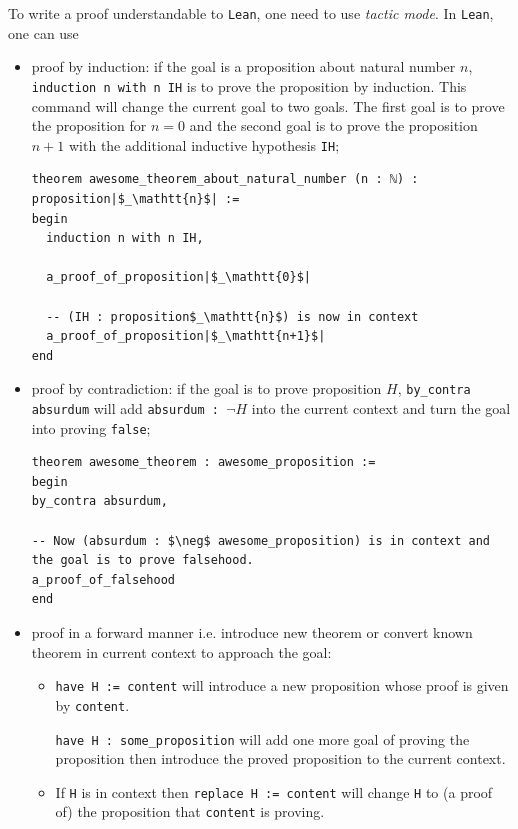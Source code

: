 \documentclass{report}
\theoremstyle{definition}
\begin{document}
To write a proof understandable to {\tt \small Lean}, one need to use {\it tactic mode}. In {\tt \small Lean}, one can use
\begin{itemize}
  \item proof by induction: if the goal is a proposition about natural number $n$, {\tt \small induction n with n IH} is to prove the proposition by induction. This command will change the current goal to two goals. The first goal is to prove the proposition for $n=0$ and the second goal is to prove the proposition $n+1$ with the additional inductive hypothesis {\tt \small IH};

\begin{verbatim}
theorem awesome_theorem_about_natural_number (n : ℕ) : proposition|$_\mathtt{n}$| :=
begin
  induction n with n IH,

  a_proof_of_proposition|$_\mathtt{0}$|

  -- (IH : proposition$_\mathtt{n}$) is now in context
  a_proof_of_proposition|$_\mathtt{n+1}$|
end
\end{verbatim}

  \item proof by contradiction: if the goal is to prove proposition $H$, {\tt \small by\_contra absurdum} will add {\tt \small absurdum : $\neg H$} into the current context and turn the goal into proving {\tt \small false};

\begin{verbatim}
theorem awesome_theorem : awesome_proposition :=
begin
by_contra absurdum,

-- Now (absurdum : $\neg$ awesome_proposition) is in context and the goal is to prove falsehood.
a_proof_of_falsehood
end
\end{verbatim}
  \item proof in a forward manner i.e. introduce new theorem or convert known theorem in current context to approach the goal:
  \begin{itemize}
    \item {\tt \small have H := content} will introduce a new proposition whose proof is given by {\tt \small content}.
    
    {\tt \small have H : some\_proposition} will add one more goal of proving the proposition then introduce the proved proposition to the current context.

    \item If {\tt \small H} is in context then {\tt \small replace H := content} will change {\tt \small H} to (a proof of) the proposition that {\tt \small content} is proving.
    

\end{itemize}
\end{itemize}
\end{document}
